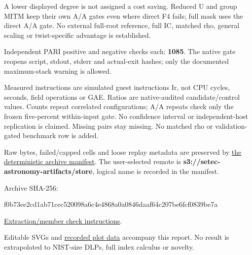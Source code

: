 \documentclass[
  10pt,
]{article}
\newenvironment{Shaded}{}{}
\newcommand{\NormalTok}[1]{#1}
\begin{document}
A lower displayed degree is not assigned a cost saving. Reduced U and
group MITM keep their own A/A gates even where direct F4 fails; full
mask uses the direct A/A gate. No external full-root reference, full IC,
matched rho, general scaling or twist-specific advantage is established.

Independent PARI positive and negative checks each: \textbf{1085}. The
native gate reopens script, stdout, stderr and actual-exit hashes; only
the documented maximum-stack warning is allowed.

Measured instructions are simulated guest instructions Ir, not CPU
cycles, seconds, field operations or GAE. Ratios are native-audited
candidate/control values. Counts repeat correlated configurations; A/A
repeats check only the frozen five-percent within-input gate. No
confidence interval or independent-host replication is claimed. Missing
pairs stay missing. No matched rho or validation-gated benchmark row is
added.

Raw bytes, failed/capped cells and loose replay metadata are preserved
by \href{../../../execution-v3/continue-20261026/RAW_ARTIFACTS.json}{the
deterministic archive manifest}. The user-selected remote is
\textbf{s3://setec-astronomy-artifacts/store}, logical name is recorded
in the manifest.

Archive SHA-256:

\begin{Shaded}
\begin{Highlighting}[]
\NormalTok{f0b73ee2cd1ab71cec520098a6c4e4868a0a0846daaf64c207be6fcf0839be7a}
\end{Highlighting}
\end{Shaded}

\href{../../../execution-v3/continue-20261026/README.md}{Extraction/member
check instructions}.

Editable SVGs and \href{PLOT_DATA.json}{recorded plot data} accompany
this report. No result is extrapolated to NIST-size DLPs, full index
calculus or novelty.
\end{document}

